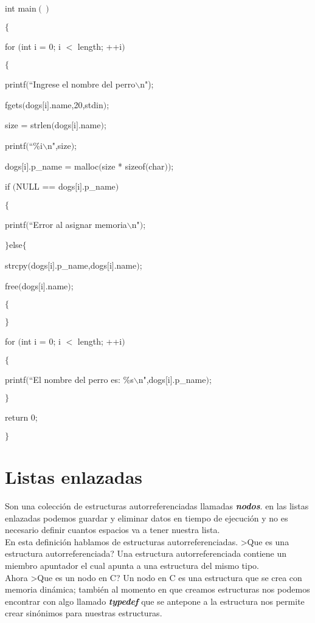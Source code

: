 \documentclass[]{article}
\begin{document}
	int main$()$
	
	$\lbrace$
	
	for $($int i = 0; i $<$ length; ++i$)$
	
	$\lbrace$
	
	printf$($``Ingrese el nombre del perro$\backslash$n");
	
	fgets$($dogs$[$i$]$.name,20,stdin$)$;
	
	size = strlen$($dogs$[$i$]$.name$)$;
	
	printf$($``\%i$\backslash$n",size$)$;
	
	dogs$[$i$]$.p\_name = malloc$($size * sizeof$($char$))$;
	
	if $($NULL == dogs$[$i$]$.p\_name$)$
	
	$\lbrace$
	
	printf$($``Error al asignar memoria$\backslash$n"$)$;
	
	$\rbrace$else$\lbrace$
	
	strcpy$($dogs$[$i$]$.p\_name,dogs$[$i$]$.name$)$;
	
	free$($dogs$[$i$]$.name$)$;
	
	$\lbrace$
	
	$\rbrace$
	
	for $($int i = 0; i $<$ length; ++i$)$
	
	$\lbrace$
	
	printf$($``El nombre del perro es: \%s$\backslash$n",dogs$[$i$]$.p\_name$)$;
	
	$\rbrace$
	
	return 0;
	
	$\rbrace$
	
	\section{Listas enlazadas}
	
	Son una colección de estructuras autorreferenciadas llamadas \textit{\textbf{nodos}}. en las listas enlazadas podemos guardar y eliminar datos en tiempo de ejecución y no es necesario definir cuantos espacios va a tener nuestra lista.\\
	
	En esta definición hablamos de estructuras autorreferenciadas. >Que es una estructura autorreferenciada? Una estructura autorreferenciada contiene un miembro apuntador el cual apunta a una estructura del mismo tipo.\\
	
	Ahora >Que es un nodo en C? Un nodo en C es una estructura que se crea con memoria dinámica; también al momento en que creamos estructuras nos podemos encontrar con algo llamado \textit{\textbf{typedef}} que se antepone a la estructura nos permite crear sinónimos para nuestras estructuras.\\
	
\end{document}
